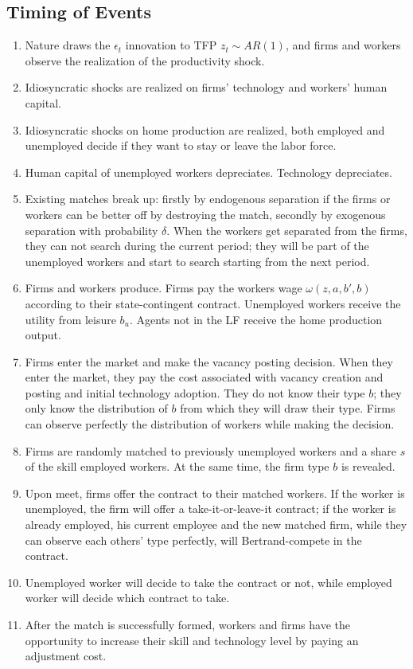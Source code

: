 \documentclass[12pt]{article}
\newcommand{\1}{\mathbb{1}}
\begin{document}
\subsection{Timing of Events}
\begin{enumerate}
\item Nature draws the $\epsilon_t$ innovation to TFP $z_t \sim AR(1)$, and firms and workers observe the realization of the productivity shock. 
\item Idiosyncratic shocks are realized on firms' technology and workers' human capital. 
\item Idiosyncratic shocks on home production are realized, both employed and unemployed decide if they want to stay or leave the labor force.
\item Human capital of unemployed workers depreciates. Technology depreciates. 
\item Existing matches break up: firstly by endogenous separation if the firms or workers can be better off by destroying the match, secondly by exogenous separation with probability $\delta$. When the workers get separated from the firms, they can not search during the current period; they will be part of the unemployed workers and start to search starting from the next period. 
\item Firms and workers produce. Firms pay the workers wage $\omega(z,a,b',b)$ according to their state-contingent contract. Unemployed workers receive the utility from leisure $b_u$. Agents not in the LF receive the home production output. 
\item Firms enter the market and make the vacancy posting decision. When they enter the market, they pay the cost associated with vacancy creation and posting and initial technology adoption. They do not know their type $b$; they only know the distribution of $b$ from which they will draw their type. Firms can observe perfectly the distribution of workers while making the decision. 
\item Firms are randomly matched to previously unemployed workers and a share $s$ of the skill employed workers. At the same time, the firm type $b$ is revealed. 
\item Upon meet, firms offer the contract to their matched workers. If the worker is unemployed, the firm will offer a take-it-or-leave-it contract; if the worker is already employed, his current employee and the new matched firm, while they can observe each others' type perfectly, will Bertrand-compete in the contract. 
\item Unemployed worker will decide to take the contract or not, while employed worker will decide which contract to take. 
\item After the match is successfully formed, workers and firms have the opportunity to increase their skill and technology level by paying an adjustment cost. 
\end{enumerate}
\end{document}

